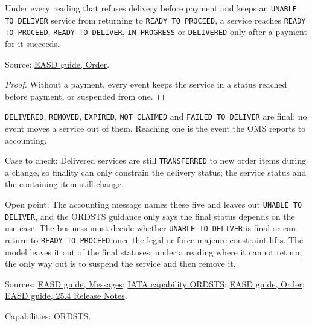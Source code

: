 \begin{theorem}
  \label{thm:delivery-paid-with-gate}
  Under every reading that refuses delivery before payment and keeps an
  \texttt{UNABLE TO DELIVER} service from returning to
  \texttt{READY TO PROCEED}, a service reaches \texttt{READY TO PROCEED},
  \texttt{READY TO DELIVER}, \texttt{IN PROGRESS} or \texttt{DELIVERED} only
  after a payment for it succeeds.

  Source: \href{https://standards.atlassian.net/wiki/spaces/EASD/pages/574849062/Order}{EASD guide, Order}.
\end{theorem}
\begin{proof}
  Without a payment, every event keeps the service in a status reached
  before payment, or suspended from one.
\end{proof}

\begin{definition}
  \label{def:delivery-final-statuses}
  \texttt{DELIVERED}, \texttt{REMOVED}, \texttt{EXPIRED}, \texttt{NOT
  CLAIMED} and \texttt{FAILED TO DELIVER} are final: no event moves a
  service out of them. Reaching one is the event the OMS reports to
  accounting.

  Case to check: Delivered services are still \texttt{TRANSFERRED} to new
  order items during a change, so finality can only constrain the delivery
  status; the service status and the containing item still change.

  Open point: The accounting message names these five and leaves out
  \texttt{UNABLE TO DELIVER}, and the ORDSTS guidance only says the final
  status depends on the use case. The business must decide whether
  \texttt{UNABLE TO DELIVER} is final or can return to \texttt{READY TO
  PROCEED} once the legal or force majeure constraint lifts.  The model
  leaves it out of the final statuses; under a reading where it cannot
  return, the only way out is to suspend the service and then remove it.

  Sources: \href{https://standards.atlassian.net/wiki/spaces/EASD/pages/574652427/Messages}{EASD guide, Messages};
  \href{https://retailing.iata.org/armi/docs/ORDSTS/}{IATA capability ORDSTS};
  \href{https://standards.atlassian.net/wiki/spaces/EASD/pages/574849062/Order}{EASD guide, Order};
  \href{https://standards.atlassian.net/wiki/spaces/EASD/pages/2533031940}{EASD guide, 25.4 Release Notes}.

  Capabilities: ORDSTS.
\end{definition}

